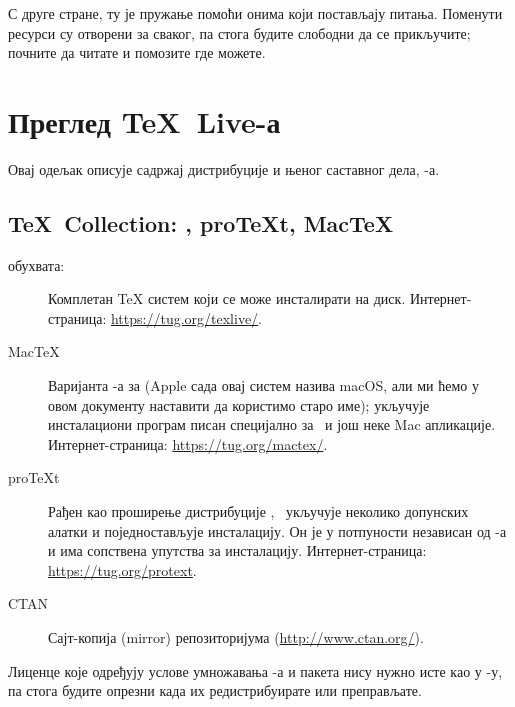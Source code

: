 \documentclass{article}
\begin{document}
С друге стране, ту је пружање помоћи онима који постављају питања. 
Поменути ресурси су отворени за сваког, па стога будите слободни да се 
прикључите; почните да читате и помозите где можете.


\section{Преглед \protect\TeX\protect\ Live{}-а}
\label{sec:overview-tl}

Овај одељак описује садржај дистрибуције \TK{} и њеног саставног дела, \TL{}-а.


\subsection{\protect\TeX\protect\ Collection: \protect\TL,
  pro\protect\TeX{}t, Mac\protect\TeX}
\label{sec:tl-coll-dists}

\TK{} \DVD{} обухвата:

\begin{description}

\item [\TL] Комплетан \TeX{} систем који се може инсталирати на диск.
  Интернет-страница: \url{https://tug.org/texlive/}.

\item [Mac\TeX] Варијанта \TL{}-а за \MacOSX (Apple сада овај систем
  назива macOS, али ми ћемо у овом документу наставити да користимо
  старо име); укључује инсталациони програм писан специјално за 
  \MacOSX\ и још неке Mac апликације.
  Интернет-страница: \url{https://tug.org/mactex/}.

\item [pro\TeX{}t] Рађен као проширење \Windows{} дистрибуције
  \MIKTEX, \ProTeXt\ укључује неколико допунских алатки и
  поједностављује инсталацију. Он је у потпуности независан од \TL{}-а
  и има сопствена упутства за инсталацију. Интернет-страница:
  \url{https://tug.org/protext}.

\item [CTAN] Сајт-копија (mirror) репозиторијума \CTAN{}
  (\url{http://www.ctan.org/}).

\end{description}

Лиценце које одређују услове умножавања \CTAN{}-а и пакета
   нису нужно исте као у \TL{}-у, па стога будите
  опрезни када их редистрибуирате или преправљате.
\end{document}
